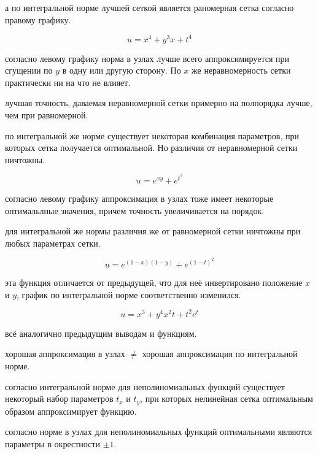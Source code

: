 \conclusion а по интегральной норме лучшей сеткой является раномерная сетка согласно правому графику.

$$ u = x^4 + y^3x + t^4 $$


\conclusion согласно левому графику норма в узлах лучше всего аппроксимируется при сгущении по $y$ в одну или другую сторону. По $x$ же неравномерность сетки практически ни на что не влияет.

\conclusion лучшая точность, даваемая неравномерной сетки примерно на полпорядка лучше, чем при равномерной.

\conclusion по интегральной же норме существует некоторая комбинация параметров, при которых сетка получается оптимальной. Но различия от неравномерной сетки ничтожны.

$$ u = e^{xy} + e^{t^2} $$


\conclusion согласно левому графику аппроксимация в узлах тоже имеет некоторые оптимальлные значения, причем точность увеличивается на порядок.

\conclusion для интегральной же нормы различия же от равномерной сетки ничтожны при любых параметрах сетки.

$$ u = e^{(1-x)(1-y)} + e^{(1-t)^2} $$


\conclusion эта функция отличается от предыдущей, что для неё инвертировано положение $x$ и $y$, график по интегральной норме соответственно изменился.

$$ u = x^3 + y^4 x^2 t + t^2 e^t $$


\conclusion всё аналогично предыдущим выводам и функциям.


\conclusion хорошая аппроксимация в узлах $\neq$ хорошая аппроксимация по интегральной норме.

\conclusion согласно интегральной норме для неполиномиальных функций существует некоторый набор параметров $t_x$ и $t_y$, при которых нелинейная сетка оптимальным образом аппроксимирует функцию.

\conclusion согласно норме в узлах для неполиномиальных функций оптимальными являются параметры в окрестности $\pm 1$.


